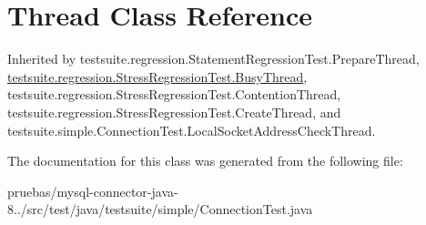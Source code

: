 \hypertarget{class_thread}{}\section{Thread Class Reference}
\label{class_thread}


Inherited by testsuite.\+regression.\+Statement\+Regression\+Test.\+Prepare\+Thread, \mbox{\hyperlink{classtestsuite_1_1regression_1_1_stress_regression_test_1_1_busy_thread}{testsuite.\+regression.\+Stress\+Regression\+Test.\+Busy\+Thread}}, testsuite.\+regression.\+Stress\+Regression\+Test.\+Contention\+Thread, testsuite.\+regression.\+Stress\+Regression\+Test.\+Create\+Thread, and testsuite.\+simple.\+Connection\+Test.\+Local\+Socket\+Address\+Check\+Thread.



The documentation for this class was generated from the following file\+:\begin{DoxyCompactItemize}
\item 
pruebas/mysql-\/connector-\/java-\/8../src/test/java/testsuite/simple/Connection\+Test.\+java\end{DoxyCompactItemize}
